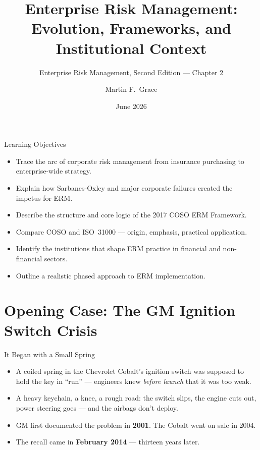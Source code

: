 \documentclass[11pt, aspectratio=169]{beamer}
\title[ERM Ch.\,2]{Enterprise Risk Management: Evolution, Frameworks, and Institutional Context}
\subtitle{Enterprise Risk Management, Second Edition --- Chapter 2}
\author{Martin F.\ Grace}
\institute{University of Iowa\\[2pt] Tippie College of Business\\[2pt] Vaughan Institute of Risk Management}
\date{June 2026}
\begin{document}
\begin{frame}[plain]
\titlepage
\end{frame}

\begin{frame}{Learning Objectives}
\begin{itemize}
  \item Trace the arc of corporate risk management from \alert{insurance purchasing} to enterprise-wide strategy.
  \item Explain how Sarbanes-Oxley and major corporate failures created the impetus for ERM.
  \item Describe the structure and core logic of the \alert{2017 COSO ERM Framework}.
  \item Compare COSO and ISO~31000 --- origin, emphasis, practical application.
  \item Identify the institutions that shape ERM practice in financial and non-financial sectors.
  \item Outline a realistic phased approach to ERM implementation.
\end{itemize}
\end{frame}

\section{Opening Case: The GM Ignition Switch Crisis}

\begin{frame}{It Began with a Small Spring}
\begin{itemize}
  \item A coiled spring in the Chevrolet Cobalt's ignition switch was supposed to hold the key in ``run'' --- engineers knew \emph{before launch} that it was too weak.
  \item A heavy keychain, a knee, a rough road: the switch slips, the engine cuts out, power steering goes --- and the \alert{airbags don't deploy}.
  \item GM first documented the problem in \textbf{2001}. The Cobalt went on sale in 2004.
  \item The recall came in \textbf{February 2014} --- thirteen years later.
\end{itemize}
\end{frame}
\end{document}
